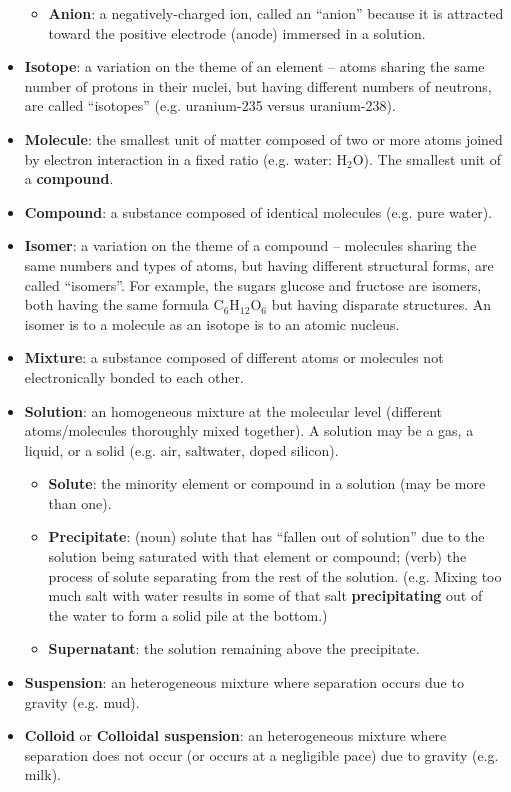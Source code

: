 \begin{itemize}
\begin{itemize}
\item{} {\bf Anion}: a negatively-charged ion, called an ``anion'' because it is attracted toward the positive electrode (anode) immersed in a solution.  
\end{itemize}
\item{} {\bf Isotope}: a variation on the theme of an element -- atoms sharing the same number of protons in their nuclei, but having different numbers of neutrons, are called ``isotopes'' (e.g. uranium-235 versus uranium-238).  
\item{} {\bf Molecule}: the smallest unit of matter composed of two or more atoms joined by electron interaction in a fixed ratio (e.g. water: H$_{2}$O).  The smallest unit of a {\bf compound}.  
\item{} {\bf Compound}: a substance composed of identical molecules (e.g. pure water). 
\item{} {\bf Isomer}: a variation on the theme of a compound -- molecules sharing the same numbers and types of atoms, but having different structural forms, are called ``isomers''.  For example, the sugars glucose and fructose are isomers, both having the same formula C$_{6}$H$_{12}$O$_{6}$ but having disparate structures.  An isomer is to a molecule as an isotope is to an atomic nucleus.  
\item{} {\bf Mixture}: a substance composed of different atoms or molecules not electronically bonded to each other. 
\item{} {\bf Solution}: an homogeneous mixture at the molecular level (different atoms/molecules thoroughly mixed together).  A solution may be a gas, a liquid, or a solid (e.g. air, saltwater, doped silicon).    
\begin{itemize}

\item{} {\bf Solute}: the minority element or compound in a solution (may be more than one).  
\item{} {\bf Precipitate}: (noun) solute that has ``fallen out of solution'' due to the solution being saturated with that element or compound; (verb) the process of solute separating from the rest of the solution.  (e.g. Mixing too much salt with water results in some of that salt {\bf precipitating} out of the water to form a solid pile at the bottom.)  
\item{} {\bf Supernatant}: the solution remaining above the precipitate.  
\end{itemize}
\item{} {\bf Suspension}: an heterogeneous mixture where separation occurs due to gravity (e.g. mud).  
\item{} {\bf Colloid} or {\bf Colloidal suspension}: an heterogeneous mixture where separation does not occur (or occurs at a negligible pace) due to gravity (e.g. milk).  
\begin{itemize}


\end{itemize}
\end{itemize}
